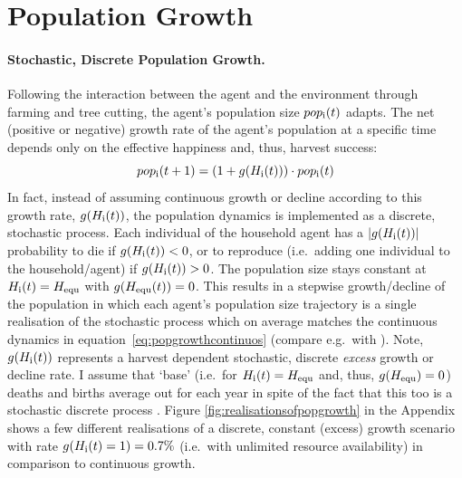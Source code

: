 
\FloatBarrier
\section{Population Growth}\label{sec:PopGrowth}
\paragraph{Stochastic, Discrete Population Growth.}
Following the interaction between the agent and the environment through farming and tree cutting, the agent's population size $pop_{\rm i}(t)$ adapts. 
The net (positive or negative) growth rate of the agent's population at a specific time depends only on the effective happiness and, thus, harvest success:
\begin{equation}\label{eq:popgrowthcontinuos}
pop_{\rm i}(t+1) = (1+g(H_{\rm i}(t))) \cdot pop_{\rm i}(t)
\end{equation}
In fact, instead of assuming continuous growth or decline according to this growth rate, $g(H_{\rm i}(t))$, the population dynamics is implemented as a discrete, stochastic process.
Each individual of the household agent has a $|g(H_{\rm i}(t))|$ probability to die if $g(H_{\rm i}(t))<0$, or %
to reproduce (i.e.\ adding one individual to the household/agent) if $g(H_{\rm i}(t))>0$.
The population size stays constant at $H_{\rm i}(t) = H_{\rm equ}$ with $g(H_{\rm equ}(t))=0$. 
This results in a stepwise growth/decline of the population in which each agent's population size trajectory is a single realisation of the stochastic process which on average matches the continuous dynamics in equation~\ref{eq:popgrowthcontinuos} (compare e.g.\ with ).
Note, $g(H_{\rm i}(t))$ represents a harvest dependent stochastic, discrete \textit{excess} growth or decline rate. 
I assume that `base' (i.e.\ for $H_{\rm i}(t) = H_{\rm equ}$ and, thus, $g(H_{\rm equ})=0$) deaths and births average out for each year in spite of the fact that this too is a stochastic discrete process \citep{Bungartz2009}.
Figure \ref{fig:realisationsofpopgrowth} in the Appendix shows a few different realisations of a discrete, constant (excess) growth scenario with rate $g(H_{\rm i}(t)=1)=0.7\%$ (i.e.\ with unlimited resource availability) in comparison to continuous growth.

